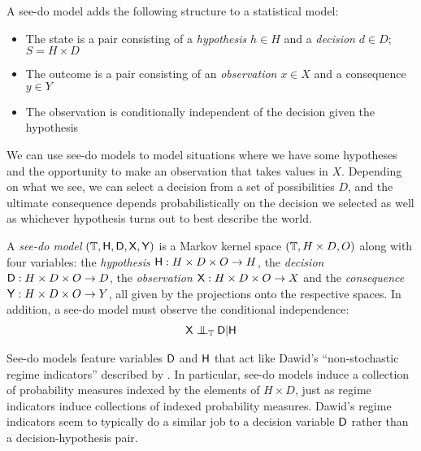 A see-do model adds the following structure to a statistical model:

\begin{itemize}
    \item The state is a pair consisting of a \emph{hypothesis} $h\in H$ and a \emph{decision} $d\in D$; $S=H\times D$
    \item The outcome is a pair consisting of an \emph{observation} $x\in X$ and a consequence $y\in Y$
    \item The observation is conditionally independent of the decision given the hypothesis
\end{itemize}

We can use see-do models to model situations where we have some hypotheses and the opportunity to make an observation that takes values in $X$. Depending on what we see, we can select a decision from a set of possibilities $D$, and the ultimate consequence depends probabilistically on the decision we selected as well as whichever hypothesis turns out to best describe the world.

\begin{definition}
A \emph{see-do model} $(\mathbb{T},\mathsf{H},\mathsf{D},\mathsf{X},\mathsf{Y})$ is a Markov kernel space $(\mathbb{T},H\times D, O)$ along with four variables: the \emph{hypothesis} $\mathsf{H}:H\times D\times O\to H$, the \emph{decision} $\mathsf{D}:H\times D\times O\to D$, the \emph{observation} $\mathsf{X}: H\times D\times O\to X$ and the \emph{consequence} $\mathsf{Y}:H\times D\times O\to Y$, all given by the projections onto the respective spaces. In addition, a see-do model must observe the conditional independence:
\begin{align}
\RV{X}\CI_\kernel{T} \RV{D}|\RV{H} \label{eq:see_do_independence_requirement}
\end{align}
\end{definition}

See-do models feature variables $\mathsf{D}$ and $\mathsf{H}$ that act like Dawid's ``non-stochastic regime indicators'' described by \citet{dawid_influence_2002,dawid_decision-theoretic_2012,dawid_decision-theoretic_2020}. In particular, see-do models induce a collection of probability measures indexed by the elements of $H\times D$, just as regime indicators induce collections of indexed probability measures. Dawid's regime indicators seem to typically do a similar job to a decision variable $\mathsf{D}$ rather than a decision-hypothesis pair.

